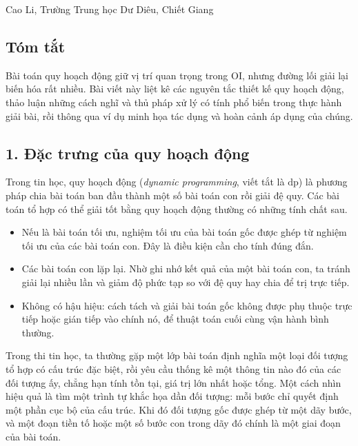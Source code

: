 \documentclass[11pt]{article}
\begin{document}
\begin{center}
Cao Li, Trường Trung học Dư Diêu, Chiết Giang
\end{center}

\subsection*{Tóm tắt}

Bài toán quy hoạch động giữ vị trí quan trọng trong OI, nhưng đường lối giải
lại biến hóa rất nhiều. Bài viết này liệt kê các nguyên tắc thiết kế quy hoạch
động, thảo luận những cách nghĩ và thủ pháp xử lý có tính phổ biến trong thực
hành giải bài, rồi thông qua ví dụ minh họa tác dụng và hoàn cảnh áp dụng của
chúng.

\subsection*{1. Đặc trưng của quy hoạch động}

Trong tin học, quy hoạch động (\emph{dynamic programming}, viết tắt là
\(\mathrm{dp}\)) là phương pháp chia bài toán ban đầu thành một số bài toán con
rồi giải đệ quy. Các bài toán tổ hợp có thể giải tốt bằng quy hoạch động thường
có những tính chất sau.

\begin{itemize}
  \item Nếu là bài toán tối ưu, nghiệm tối ưu của bài toán gốc được ghép từ
  nghiệm tối ưu của các bài toán con. Đây là điều kiện cần cho tính đúng đắn.
  \item Các bài toán con lặp lại. Nhờ ghi nhớ kết quả của một bài toán con, ta
  tránh giải lại nhiều lần và giảm độ phức tạp so với đệ quy hay chia để trị
  trực tiếp.
  \item Không có hậu hiệu: cách tách và giải bài toán gốc không được phụ thuộc
  trực tiếp hoặc gián tiếp vào chính nó, để thuật toán cuối cùng vận hành bình
  thường.
\end{itemize}

Trong thi tin học, ta thường gặp một lớp bài toán định nghĩa một loại đối tượng
tổ hợp có cấu trúc đặc biệt, rồi yêu cầu thống kê một thông tin nào đó của các
đối tượng ấy, chẳng hạn tính tồn tại, giá trị lớn nhất hoặc tổng. Một cách nhìn
hiệu quả là tìm một trình tự khắc họa dần đối tượng: mỗi bước chỉ quyết định
một phần cục bộ của cấu trúc. Khi đó đối tượng gốc được ghép từ một dãy bước,
và một đoạn tiền tố hoặc một số bước con trong dãy đó chính là một giai đoạn của
bài toán.
\end{document}
